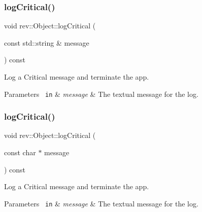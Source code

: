 \subsubsection{\texorpdfstring{logCritical()}{logCritical()}\hspace{0.1cm}{\footnotesize\ttfamily [1/2]}}
{\footnotesize\ttfamily void rev\+::\+Object\+::log\+Critical (\begin{DoxyParamCaption}\item[{const std\+::string \&}]{message }\end{DoxyParamCaption}) const\hspace{0.3cm}{\ttfamily [inline]}}



Log a Critical message and terminate the app. 


\begin{DoxyParams}[1]{Parameters}
\mbox{\texttt{ in}}  & {\em message} & The textual message for the log. \\
\hline
\end{DoxyParams}
\mbox{\label{classrev_1_1_object_a12b1396b74c4c4c1ff2f25935977937f}} 
\subsubsection{\texorpdfstring{logCritical()}{logCritical()}\hspace{0.1cm}{\footnotesize\ttfamily [2/2]}}
{\footnotesize\ttfamily void rev\+::\+Object\+::log\+Critical (\begin{DoxyParamCaption}\item[{const char $\ast$}]{message }\end{DoxyParamCaption}) const\hspace{0.3cm}{\ttfamily [inline]}}



Log a Critical message and terminate the app. 


\begin{DoxyParams}[1]{Parameters}
\mbox{\texttt{ in}}  & {\em message} & The textual message for the log. \\
\hline
\end{DoxyParams}
\mbox{\label{classrev_1_1_object_a3435060b2a2904fef41e9ee50144d076}} 
